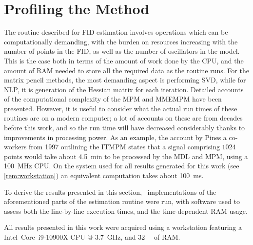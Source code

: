 \section{Profiling the Method}
\label{sec:profiling}
The routine described for \ac{FID} estimation involves operations which can be
computationally demanding, with the burden on resources
increasing with the number of points in the \ac{FID}, as well as the number of
oscillators in the model. This is the case both in terms of the amount of work
done by the \ac{CPU}, and the amount of \ac{RAM} needed to store all the
required data as the routine runs. For the matrix pencil methods, the most
demanding aspect is performing \ac{SVD}, while for \ac{NLP}, it
is generation of the Hessian matrix for each iteration. Detailed accounts of the
computational complexity of the \ac{MPM} and \ac{MMEMPM} have been
presented\cite{Hua1992,Chen2007}.  However, it is useful to consider what the
actual run times of these routines are on a modern computer; a lot of
accounts on these are from decades before this work, and so the
run time will have decreased considerably thanks to
improvements in processing power. As an example, the account by Pines a
co-workers from 1997 outlining the \ac{ITMPM} states that a signal comprising
$1024$ points would take about
\qty{4.5}{\minute} to be processed by the \ac{MDL} and \ac{MPM}, using a
\qty{100}{\mega\hertz} \ac{CPU}\cite{Lin1997}. On the system used for all
results generated for this work (see \cref{rem:workstation}) an
equivalent computation takes about \qty{100}{\milli\second}.

To derive the results presented in this section, \Python\ implementations of
the aforementioned parts of the estimation routine were run, with software used
to assess both the line-by-line execution times\cite{LineProf}, and the
time-dependent \ac{RAM} usage\cite{MemProf}.
\begin{remark}
    \label{rem:workstation}
    All results presented in this work were acquired using a workstation
    featuring a Intel\textregistered\ Core\texttrademark\ i9-10900X \ac{CPU} @
    \qty{3.7}{\giga\hertz}, and \qty{32}{\gibi\byte} of \ac{RAM}.
\end{remark}

